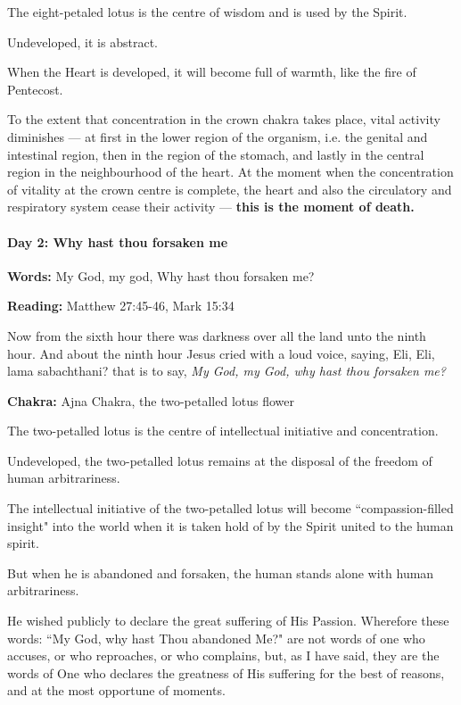 The eight-petaled lotus is the centre of wisdom and is used by the Spirit.

Undeveloped, it is abstract.

When the Heart is developed, it will become full of warmth, like the fire of Pentecost.

To the extent that concentration in the crown chakra takes place, vital activity diminishes — at first in the lower region of the organism, i.e. the genital and intestinal region, then in the region of the stomach, and lastly in the central region in the neighbourhood of the heart. At the moment when the concentration of vitality at the crown centre is complete, the heart and also the circulatory and respiratory system cease their activity — \textbf{this is the moment of death.}


\paragraph{Day 2: Why hast thou forsaken me}

\textbf{Words:} My God, my god, Why hast thou forsaken me?

\textbf{Reading:} Matthew 27:45-46, Mark 15:34


\begin{quotex}
Now from the sixth hour there was darkness over all the land unto the ninth hour. And about the ninth hour Jesus cried with a loud voice, saying, Eli, Eli, lama sabachthani? that is to say, \textit{My God, my God, why hast thou forsaken me?}

\end{quotex}

\textbf{Chakra:} Ajna Chakra, the two-petalled lotus flower

The two-petalled lotus is the centre of intellectual initiative and concentration.

Undeveloped, the two-petalled lotus remains at the disposal of the freedom of human arbitrariness.

The intellectual initiative of the two-petalled lotus will become ``compassion-filled insight" into the world when it is taken hold of by the Spirit united to the human spirit.

But when he is abandoned and forsaken, the human stands alone with human arbitrariness.


\begin{quotex}
He wished publicly to declare the great suffering of His Passion. Wherefore these words: ``My God, why hast Thou abandoned Me?" are not words of one who accuses, or who reproaches, or who complains, but, as I have said, they are the words of One who declares the greatness of His suffering for the best of reasons, and at the most opportune of moments. 

\end{quotex}

